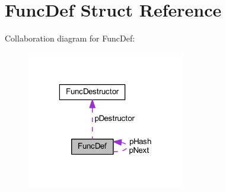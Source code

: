 \hypertarget{struct_func_def}{\section{Func\-Def Struct Reference}
\label{struct_func_def}
}


Collaboration diagram for Func\-Def\-:\nopagebreak
\begin{figure}[H]
\begin{center}
\leavevmode
\includegraphics[width=196pt]{struct_func_def__coll__graph}
\end{center}
\end{figure}
